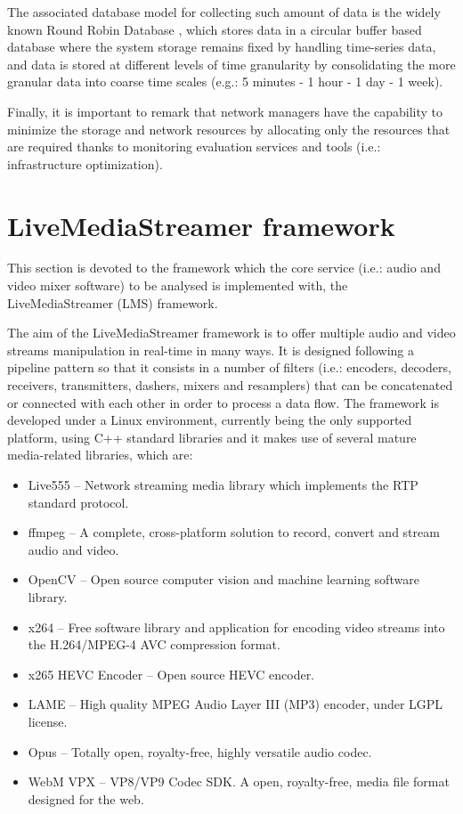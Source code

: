 The associated database model for collecting such amount of data is the widely known Round Robin Database \cite{rrdb}, which stores data in a circular buffer based database where the system storage remains fixed by handling time-series data, and data is stored at different levels of time granularity by consolidating the more granular data into coarse time scales (e.g.: 5 minutes - 1 hour - 1 day - 1 week).

Finally, it is important to remark that network managers have the capability to minimize the storage and network resources by allocating only the resources that are required thanks to monitoring evaluation services and tools (i.e.: infrastructure optimization).
 
\section{LiveMediaStreamer framework}\label{SOA:LMS}

This section is devoted to the framework which the core service (i.e.: audio and video mixer software) to be analysed is implemented with, the LiveMediaStreamer (LMS) framework. 

The aim of the LiveMediaStreamer framework is to offer multiple audio and video streams manipulation in real-time in many ways. It is designed following a pipeline pattern so that it consists in a number of filters (i.e.: encoders, decoders, receivers, transmitters, dashers, mixers and resamplers) that can be concatenated or connected with each other in order to process a data flow. The framework is developed under a Linux environment, currently being the only supported platform, using C++ standard libraries and it makes use of several mature media-related libraries, which are: 

\begin{itemize}
\item Live555 \cite{l555} – Network streaming media library which implements the RTP standard protocol.
\item ffmpeg \cite{ffmpeg} – A complete, cross-platform solution to record, convert and stream audio and video.
\item OpenCV \cite{opencv} – Open source computer vision and machine learning software library.
\item x264 \cite{x264} – Free software library and application for encoding video streams into the H.264/MPEG-4 AVC compression format.
\item x265 HEVC Encoder \cite{x265} – Open source HEVC encoder.
\item LAME \cite{lame} – High quality MPEG Audio Layer III (MP3) encoder, under LGPL license.
\item Opus \cite{opus} – Totally open, royalty-free, highly versatile audio codec.
\item WebM VPX \cite{webm} – VP8/VP9 Codec SDK. A open, royalty-free, media file format designed for the web.
\end{itemize}
 
